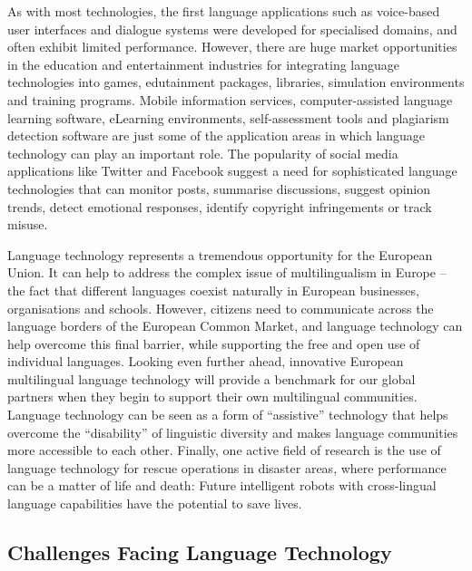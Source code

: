 \begin{multicols}{2}
As with most technologies, the first language applications such as voice-based user interfaces and dialogue systems were developed for specialised domains, and often exhibit limited performance. However, there are huge market opportunities in the education and entertainment industries for integrating language technologies into games, edutainment packages, libraries, simulation environments and training programs. Mobile information services, computer-assisted language learning software, eLearning environments, self-assessment tools and plagiarism detection software are just some of the application areas in which language technology can play an important role. The popularity of social media applications like Twitter and Facebook suggest a need for sophisticated language technologies that can monitor posts, summarise discussions, suggest opinion trends, detect emotional responses, identify copyright infringements or track misuse.



Language technology represents a tremendous opportunity for the European Union. It can help to address the complex issue of multilingualism in Europe – the fact that different languages coexist naturally in European businesses, organisations and schools. However, citizens need to communicate across the language borders of the European Common Market, and language technology can help overcome this final barrier, while supporting the free and open use of individual languages. Looking even further ahead, innovative European multilingual language technology will provide a benchmark for our global partners when they begin to support their own multilingual communities. Language technology can be seen as a form of “assistive” technology that helps overcome the “disability” of linguistic diversity and makes language communities more accessible to each other. Finally, one active field of research is the use of language technology for rescue operations in disaster areas, where performance can be a matter of life and death: Future intelligent robots with cross-lingual language capabilities have the potential to save lives.

\subsection{Challenges Facing Language Technology}


\end{multicols}
